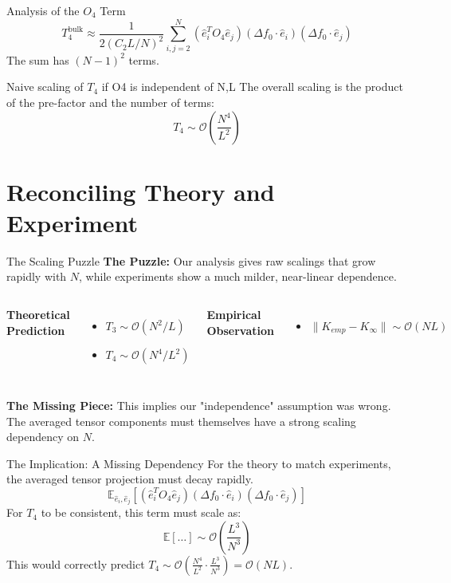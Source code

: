 \documentclass{beamer}
\newcommand{\Order}{\mathcal{O}}
\begin{document}
\begin{frame}{Analysis of the $O_4$ Term}
\[
T_4^{\text{bulk}} \approx \frac{1}{2(C_2 L/N)^2} \sum_{i,j=2}^N (\hat{e}_{i}^{T}O_{4}\hat{e}_{j})(\Delta f_{0}\cdot \hat{e}_{i})(\Delta f_{0}\cdot \hat{e}_{j})
\]
The sum has $(N-1)^2$ terms.
\begin{alertblock}{Naive scaling of $T_4$ if O4 is independent of N,L}
The overall scaling is the product of the pre-factor and the number of terms:
\[ T_4 \sim \Order\left(\frac{N^4}{L^2}\right) \]
\end{alertblock}
\end{frame}

\section{Reconciling Theory and Experiment}

\begin{frame}{The Scaling Puzzle}
\textbf{The Puzzle:} Our analysis gives raw scalings that grow rapidly with $N$, while experiments show a much milder, near-linear dependence.
\begin{columns}[T]
\textbf{Theoretical Prediction}
\begin{itemize}
    \item $T_3 \sim \Order(N^2/L)$
    \item $T_4 \sim \Order(N^4/L^2)$
\end{itemize}
\textbf{Empirical Observation}
\begin{itemize}
    \item $\|K_{emp} - K_\infty\| \sim \Order(NL)$
\end{itemize}
\end{columns}
\vfill
\textbf{The Missing Piece:}
This implies our "independence" assumption was wrong. The averaged tensor components must themselves have a strong scaling dependency on $N$.
\end{frame}

\begin{frame}{The Implication: A Missing Dependency}
For the theory to match experiments, the averaged tensor projection must decay rapidly.
\[
\mathbb{E}_{\hat{e}_i, \hat{e}_j}[(\hat{e}_{i}^{T}O_{4}\hat{e}_{j})(\Delta f_{0}\cdot \hat{e}_{i})(\Delta f_{0}\cdot \hat{e}_{j})]
\]
\vfill
For $T_4$ to be consistent, this term must scale as:
\[
\mathbb{E}[\dots] \sim \Order\left(\frac{L^3}{N^3}\right)
\]
This would correctly predict $T_4 \sim \Order\left(\frac{N^4}{L^2} \cdot \frac{L^3}{N^3}\right) = \Order(NL)$.
\end{frame}
\end{document}
